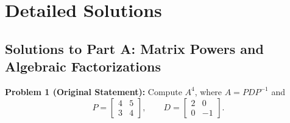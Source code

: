 \documentclass[11pt, letterpaper]{article}
\theoremstyle{definition}
\theoremstyle{remark}
\begin{document}
\newpage
\section{Detailed Solutions}

\subsection{Solutions to Part A: Matrix Powers and Algebraic Factorizations}

\textbf{Problem 1 (Original Statement):}
Compute $A^{4}$, where $A = PDP^{-1}$ and
\[
P = \begin{bmatrix} 4 & 5 \\ 3 & 4 \end{bmatrix}, \qquad D = \begin{bmatrix} 2 & 0 \\ 0 & -1 \end{bmatrix}.
\]
\end{document}
